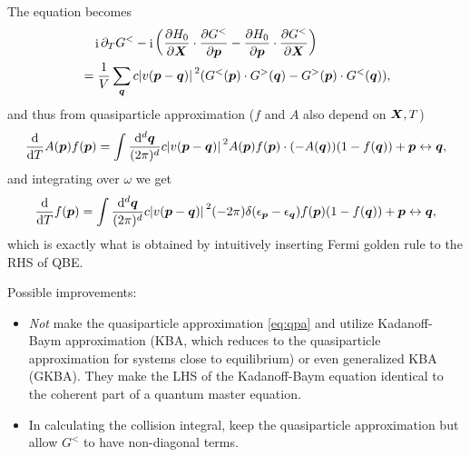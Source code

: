 \documentclass[t]{beamer}
\DeclareMathOperator{\ii}{i}
\begin{document}
\begin{frame}[allowframebreaks]
The equation becomes 
\begin{equation}
    \begin{aligned}
        &\quad \ii \partial_T G^< 
        - \ii \left(
            \pdv{H_0}{\vb*{X}} \cdot \pdv{G^<}{\vb*{p}}
            - \pdv{H_0}{\vb*{p}} \cdot \pdv{G^<}{\vb*{X}}
        \right)  \\
        &= \frac{1}{V} \sum_{\vb*{q}} c \abs*{v(\vb*{p} - \vb*{q})}^2 
        ( G^<(\vb*{p}) \cdot G^>(\vb*{q})
        - G^>(\vb*{p}) \cdot G^<(\vb*{q}) ),
    \end{aligned}
\end{equation}
and thus from quasiparticle approximation 
($f$ and $A$ also depend on $\vb*{X}, T$)
\begin{equation}
    \dv{T} A(\vb*{p}) f(\vb*{p}) 
    = \int \frac{\dd[d]{\vb*{q}}}{(2\pi)^d} 
    c \abs*{v(\vb*{p} - \vb*{q})}^2 
    A(\vb*{p}) f(\vb*{p}) \cdot (- A(\vb*{q})) (1 - f(\vb*{q})) + \vb*{p} \leftrightarrow \vb*{q},
\end{equation}
and integrating over $\omega$ we get 
\begin{equation}
    \dv{T} f(\vb*{p}) = \int \frac{\dd[d]{\vb*{q}}}{(2\pi)^d} 
    c \abs*{v(\vb*{p} - \vb*{q})}^2 
    (- 2 \pi) \delta(\epsilon_{\vb*{p}} - \epsilon_{\vb*{q}}) f(\vb*{p}) (1 - f(\vb*{q}))
    + \vb*{p} \leftrightarrow \vb*{q},
\end{equation}
which is exactly what is obtained by 
intuitively inserting Fermi golden rule to the RHS of QBE.

\framebreak

Possible improvements:

\begin{itemize}
    \item \emph{Not} make the quasiparticle approximation \eqref{eq:qpa}
    and utilize Kadanoff-Baym approximation (KBA, which reduces to the quasiparticle approximation for systems close to equilibrium)
    or even generalized KBA (GKBA).
    They make the LHS of the Kadanoff-Baym equation identical to the coherent part of a quantum master equation.
    \item In calculating the collision integral,
    keep the quasiparticle approximation but allow $G^<$ to have non-diagonal terms.
\end{itemize}

\end{frame}
\end{document}
